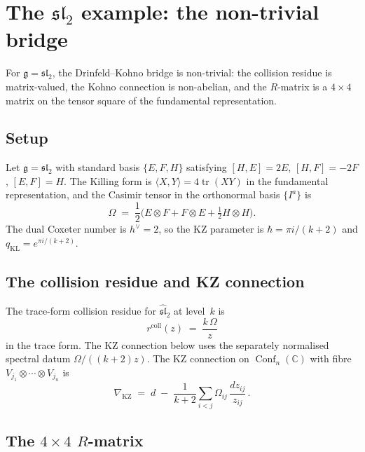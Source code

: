 \documentclass[11pt,reqno]{amsart}
\theoremstyle{definition}
\theoremstyle{remark}
\DeclareMathOperator{\Conf}{Conf}
\DeclareMathOperator{\tr}{tr}
\newcommand{\fg}{\mathfrak{g}}
\newcommand{\CC}{\mathbb{C}}
\newcommand{\hv}{h^{\vee}}
\numberwithin{equation}{section}
\begin{document}
\section{The $\mathfrak{sl}_2$ example: the non-trivial bridge}
\label{sec:dk-sl2}

For $\fg = \mathfrak{sl}_2$, the Drinfeld--Kohno bridge is
non-trivial: the collision residue is matrix-valued, the
Kohno connection is non-abelian, and the $R$-matrix is a
$4 \times 4$ matrix on the tensor square of the fundamental
representation.

\subsection{Setup}

Let $\fg = \mathfrak{sl}_2$ with standard basis
$\{E, F, H\}$ satisfying $[H, E] = 2E$, $[H, F] = -2F$,
$[E, F] = H$.  The Killing form is
$\langle X, Y \rangle = 4\tr(XY)$ in the fundamental
representation, and the Casimir tensor in the orthonormal
basis $\{I^a\}$ is
\[
\Omega
\;=\;
\frac{1}{2}\bigl(
E \otimes F + F \otimes E + \tfrac{1}{2}H \otimes H
\bigr).
\]
The dual Coxeter number is $\hv = 2$, so the KZ parameter
is $\hbar = \pi i/(k+2)$ and
$q_{\mathrm{KL}} = e^{\pi i/(k+2)}$.

\subsection{The collision residue and KZ connection}

The trace-form collision residue for $\widehat{\mathfrak{sl}}_2$ at
level~$k$ is
\[
r^{\mathrm{coll}}(z)
\;=\;
\frac{k\,\Omega}{z}
\]
in the trace form.  The KZ connection below uses the separately
normalised spectral datum $\Omega/((k+2)z)$.
The KZ connection on $\Conf_n(\CC)$ with fibre
$V_{j_1} \otimes \cdots \otimes V_{j_n}$ is
\[
\nabla_{\mathrm{KZ}}
\;=\;
d
\;-\;
\frac{1}{k+2}
\sum_{i < j}
\Omega_{ij}\,\frac{dz_{ij}}{z_{ij}}\,.
\]

\subsection{The $4 \times 4$ $R$-matrix}
\end{document}
